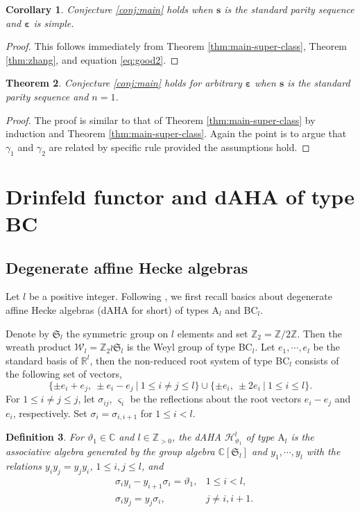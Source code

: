 \documentclass[11pt,reqno]{amsart}
\numberwithin{equation}{section}
\newtheorem{thm}{Theorem}[section]
\newtheorem{cor}[thm]{Corollary}
\newtheorem{dfn}[thm]{Definition}
\theoremstyle{definition}
\theoremstyle{remark}
\newcommand{\Z}{\mathbb{Z}}
\newcommand{\fkS}{\mathfrak{S}}
\newcommand{\bC}{\mathbb{C}}
\newcommand{\bR}{\mathbb{R}}
\newcommand{\lle}{\leqslant}
\newcommand{\ve}{\varepsilon}
\newcommand{\s}{{\bm s}}
\begin{document}
\begin{cor}
Conjecture \ref{conj:main} holds when $\s$ is the standard parity sequence and $\bm\ve$ is simple.
\end{cor}
\begin{proof}
This follows immediately from Theorem \ref{thm:main-super-class}, Theorem \ref{thm:zhang}, and equation \eqref{eq:good2}.
\end{proof}

\begin{thm}
Conjecture \ref{conj:main} holds for arbitrary $\bm\ve$ when $\s$ is the standard parity sequence and $n=1$.
\end{thm}
\begin{proof}
The proof is similar to that of Theorem \ref{thm:main-super-class} by induction and Theorem \ref{thm:main-super-class}. Again the point is to argue that $\gamma_1$ and $\gamma_2$ are related by specific rule provided the assumptions hold.
\end{proof}


\section{Drinfeld functor and dAHA of type BC}\label{sec:schur-weyl}
\subsection{Degenerate affine Hecke algebras} Let $l$ be a positive integer. Following \cite{Chen2014twisted}, we first recall basics about degenerate affine Hecke algebras (dAHA for short) of types A$_l$ and BC$_l$.

Denote by $\fkS_l$ the symmetric group on $l$ elements and set $\Z_2=\Z/2\Z$. Then the wreath product $\mathscr W_l=\Z_2\wr \fkS_l$ is the Weyl group of type BC$_l$. Let $e_1,\cdots,e_l$ be the standard basis of $\bR^l$, then the non-reduced root system of type BC$_l$ consists of the following set of vectors,
\[
\{\pm e_i+e_j, ~ \pm e_i-e_j~|~ 1\lle i\ne j \lle l\} \cup \{\pm e_i,~ \pm 2e_i ~|~ 1\lle i\lle l\}.
\]
For $1\lle i\ne j\lle j$, let $\sigma_{ij}$, $\varsigma_i$ be the reflections about the root vectors $e_i-e_j$ and $e_i$, respectively. Set $\sigma_i=\sigma_{i,i+1}$ for $1\lle i<l$.
\begin{dfn}
For $\vartheta_1\in\bC$ and $l\in\Z_{>0}$, the dAHA $\mathscr{H}_{\vartheta_1}^l$ of type $\mathrm A_l$ is the associative algebra generated by the group algebra $\bC[\fkS_l]$ and $y_1,\cdots,y_l$ with the relations $y_iy_j=y_jy_i$, $1\lle i,j\lle l$, and
\begin{align*}
&\sigma_iy_i-y_{i+1}\sigma_i=\vartheta_1,&1\lle i< l,\\
&\sigma_iy_j=y_j\sigma_i, &j\ne i,i+1.
\end{align*}
\end{dfn}
\end{document}

